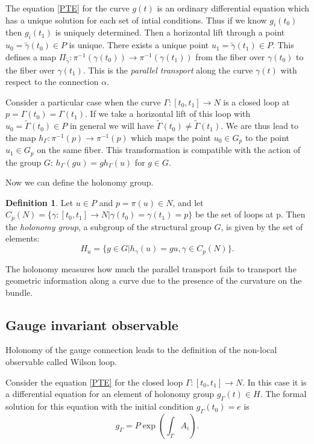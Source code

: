 \documentclass[11pt]{report}
\theoremstyle{plain}
\theoremstyle{definition}
\newtheorem{defn}[thm]{Definition}
\theoremstyle{remark}
\theoremstyle{remark}
\numberwithin{equation}{section}
\begin{document}
The equation \eqref{PTE} for the curve $g(t)$ is an ordinary differential equation which has a unique solution for each set of intial conditions. Thus if we know $g_i(t_0)$ then $g_i(t_1)$ is uniquely determined. 
Then a horizontal lift through a point $u_0 = \tilde{\gamma}(t_0) \in P$ is unique. There exists a unique point $u_1 = \tilde{\gamma}(t_1) \in P$. This defines a map $\Pi_{\tilde{\gamma}} : \pi^{-1}(\gamma(t_0))  \to \pi^{-1}(\gamma(t_1))$ from the fiber over $\gamma(t_0)$ to the fiber over $\gamma(t_1)$. This is the \textit{parallel transport} along the curve $\gamma(t)$ with respect to the connection $\alpha$.

Consider a particular case when the curve $\Gamma : [t_0,t_1] \to N$ is a closed loop at $p = \Gamma(t_0) = \Gamma (t_1)$. If we take a horizontal lift of this loop with $u_0 = \tilde{\Gamma}(t_0) \in P$ in general we will have $\tilde{\Gamma}(t_0) \ne \tilde{\Gamma}(t_1)$. We are thus lead to the map $h_{\Gamma} : \pi^{-1}(p) \to \pi^{-1}(p)$ which maps the point $u_0 \in G_p$ to the point $u_1 \in G_p$ on the same fiber. This transformation is compatible with the action of the group $G$: $h_{\Gamma}(gu) = g h_{\Gamma}(u)$ for $g \in G$. 

Now we can define the holonomy group. 
\begin{defn}
Let $u\in P$ and $p=\pi (u) \in N$, and let $C_p(N) = \{ \gamma : [t_0,t_1] \to N | \gamma(t_0) = \gamma (t_1) = p\}$ be the set of loops at p. Then the \textit{holonomy group}, a subgroup of the structural group $G$, is given by the set of elements:
$$H_u = \{ g\in G | h_{\gamma}(u) = gu, \gamma \in C_p(N)\}.$$
\end{defn}

The holonomy measures how much the parallel transport fails to transport the geometric information along a curve due to the presence of the curvature on the bundle. 



\subsection{Gauge invariant observable}

Holonomy of the gauge connection leads to the definition of the non-local observable called Wilson loop. 

Consider the equation \eqref{PTE} for the closed loop $\Gamma : [t_0,t_1] \to N$. In this case it is a differential equation  for an element of holonomy group $g_\Gamma(t) \in H$. The formal solution for this equation with the initial condition $g_\Gamma(t_0) = e$ is 
\begin{equation}
g_{\Gamma} = P\exp\left(\int_\Gamma A_i\right).
\end{equation}
\end{document}
